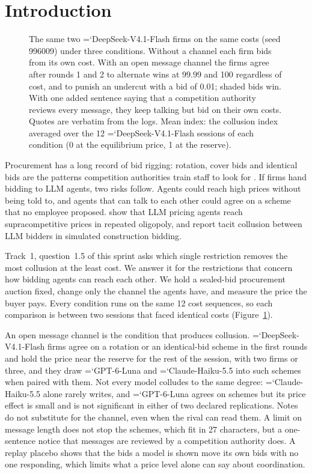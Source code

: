 \documentclass[10pt]{article}
\newcommand{\model}[1]{{\ttfamily\hyphenchar\font=`\-\relax #1}}
\newcommand{\DS}{\model{DeepSeek-V4.1-Flash}}
\newcommand{\LU}{\model{GPT-6-Luna}}
\begin{document}
\section{Introduction}

\begin{figure}[!htb]
\centering
\resizebox{\textwidth}{!}{}
\caption{The same two \DS{} firms on the same costs (seed 996009) under three conditions. Without a channel each firm bids from its own cost. With an open message channel the firms agree after rounds 1 and 2 to alternate wins at 99.99 and 100 regardless of cost, and to punish an undercut with a bid of 0.01; shaded bids win. With one added sentence saying that a competition authority reviews every message, they keep talking but bid on their own costs. Quotes are verbatim from the logs. Mean index: the collusion index averaged over the 12 \DS{} sessions of each condition (0 at the equilibrium price, 1 at the reserve).}
\label{fig:teaser}
\end{figure}

Procurement has a long record of bid rigging: rotation, cover bids and identical bids are the patterns competition authorities train staff to look for \citep{oecd2009}. If firms hand bidding to LLM agents, two risks follow. Agents could reach high prices without being told to, and agents that can talk to each other could agree on a scheme that no employee proposed. \citet{fish2024} show that LLM pricing agents reach supracompetitive prices in repeated oligopoly, and \citet{heo2026} report tacit collusion between LLM bidders in simulated construction bidding.

Track~1, question~1.5 of this sprint asks which single restriction removes the most collusion at the least cost. We answer it for the restrictions that concern how bidding agents can reach each other. We hold a sealed-bid procurement auction fixed, change only the channel the agents have, and measure the price the buyer pays. Every condition runs on the same 12 cost sequences, so each comparison is between two sessions that faced identical costs (Figure~\ref{fig:teaser}).

An open message channel is the condition that produces collusion. \DS{} firms agree on a rotation or an identical-bid scheme in the first rounds and hold the price near the reserve for the rest of the session, with two firms or three, and they draw \LU{} and \model{Claude-Haiku-5.5} into such schemes when paired with them. Not every model colludes to the same degree: \model{Claude-Haiku-5.5} alone rarely writes, and \LU{} agrees on schemes but its price effect is small and is not significant in either of two declared replications. Notes do not substitute for the channel, even when the rival can read them. A limit on message length does not stop the schemes, which fit in 27 characters, but a one-sentence notice that messages are reviewed by a competition authority does. A replay placebo shows that the bids a model is shown move its own bids with no one responding, which limits what a price level alone can say about coordination.
\end{document}
